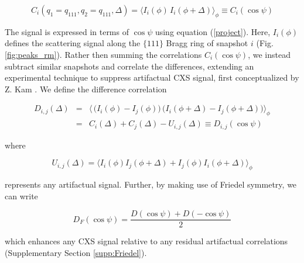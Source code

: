 \documentclass [12pt,fleqn]{article}
\def \be {\begin{equation}}
\def \ee {\end{equation}}
\def \beq {\begin{eqnarray}}
\def \eeq {\end{eqnarray}}
\begin{document}
\be \label{corz}
C_i (q_1=q_{111}, q_2=q_{111}, \Delta) = \big \langle I_i (\phi)\, I_i( \phi+\Delta) \big \rangle _{\phi} \equiv C_i(\cos \psi)
\ee

The signal is expressed in terms of  $\cos \psi $ using equation (\ref{project}). Here, $I_i(\phi)$ defines the scattering signal along the $\{111\}$ Bragg ring of snapshot $i$ (Fig. \ref{fig:peaks_rm}). Rather then summing the correlations $C_i(\cos \psi)$, we instead subtract similar snapshots and correlate the differences, extending an experimental technique to suppress artifactual CXS signal,  first conceptualized by Z. Kam \cite{kam1981fluctuation}. We define the difference correlation

\beq \label{difcorz}
D_{i,j}(\Delta) &=& \big \langle  \,\big(  I_i(\phi)-I_j(\phi) \big)\,\big( I_i( \phi + \Delta) - I_j( \phi+\Delta) \big) \big \rangle _{\phi}\\ \nonumber
&=& C_i(\Delta) + C_j(\Delta) - U_{i,j}(\Delta) \equiv D_{i,j}(\cos \psi)
\eeq

where

\be
U_{i,j}(\Delta) =  \big \langle  I_i(\phi)I_j(\phi+\Delta)  +  I_j( \phi) I_i( \phi+\Delta)\big \rangle _{\phi}
\ee

represents any artifactual signal. Further, by making use of Friedel symmetry, we can write

\be \label{DF}
D_F(\cos \psi) = \frac{D(\cos \psi) + D(-\cos \psi)}{2}
\ee

which enhances any CXS signal relative to any residual artifactual correlations (Supplementary Section \ref{supp:Friedel}).
\end{document}
